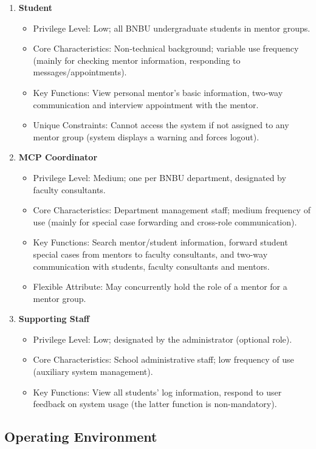 \documentclass[a4paper,12pt]{article}
\begin{document}
\begin{enumerate}
\item \textbf{Student}
\begin{itemize}
\item Privilege Level: Low; all BNBU undergraduate students in mentor groups.
\item Core Characteristics: Non-technical background; variable use frequency (mainly for checking mentor information, responding to messages/appointments).
\item Key Functions: View personal mentor's basic information, two-way communication and interview appointment with the mentor.
\item Unique Constraints: Cannot access the system if not assigned to any mentor group (system displays a warning and forces logout).
\end{itemize}

\item \textbf{MCP Coordinator}
\begin{itemize}
\item Privilege Level: Medium; one per BNBU department, designated by faculty consultants.
\item Core Characteristics: Department management staff; medium frequency of use (mainly for special case forwarding and cross-role communication).
\item Key Functions: Search mentor/student information, forward student special cases from mentors to faculty consultants, and two-way communication with students, faculty consultants and mentors.
\item Flexible Attribute: May concurrently hold the role of a mentor for a mentor group.
\end{itemize}

\item \textbf{Supporting Staff}
\begin{itemize}
\item Privilege Level: Low; designated by the administrator (optional role).
\item Core Characteristics: School administrative staff; low frequency of use (auxiliary system management).
\item Key Functions: View all students' log information, respond to user feedback on system usage (the latter function is non-mandatory).
\end{itemize}
\end{enumerate}

\subsection{Operating Environment}
\end{document}
